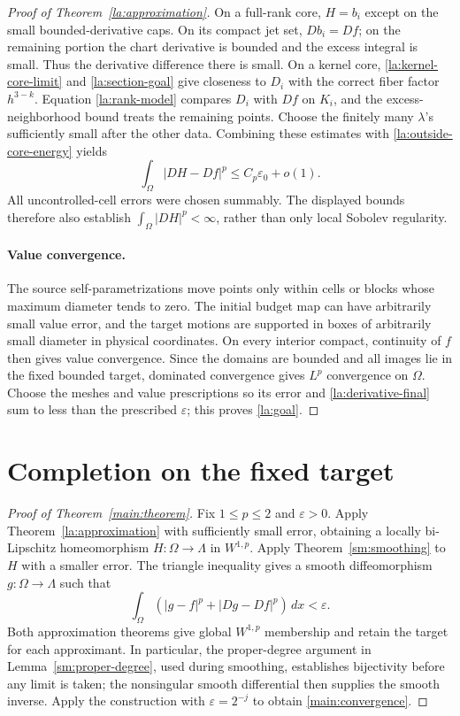 \documentclass[11pt]{article}
\numberwithin{equation}{section}
\theoremstyle{definition}
\theoremstyle{remark}
\begin{document}
\begin{proof}[Proof of Theorem~\ref{la:approximation}]
On a full-rank core, $H=b_i$ except on the small bounded-derivative
caps.  On its compact jet set, $Db_i=Df$; on the remaining portion the
chart derivative is bounded and the excess integral is small.
Thus the derivative difference there is small.  On a kernel core,
\eqref{la:kernel-core-limit} and \eqref{la:section-goal} give closeness
to $D_i$ with the correct fiber factor $h^{3-k}$.  Equation
\eqref{la:rank-model} compares $D_i$ with $Df$ on $K_i$, and the
excess-neighborhood bound treats the remaining points.  Choose the
finitely many $\lambda$'s sufficiently small after the other data.
Combining these estimates with \eqref{la:outside-core-energy} yields
\begin{equation}\label{la:derivative-final}
 \int_\Omega|DH-Df|^p\le C_p\varepsilon_0+o(1).
\end{equation}
All uncontrolled-cell errors were chosen summably.  The displayed
bounds therefore also establish $\int_\Omega|DH|^p<\infty$, rather
than only local Sobolev regularity.

\paragraph{Value convergence.}
The source self-parametrizations move points only within cells or
blocks whose maximum diameter tends to zero.  The initial budget map
can have arbitrarily small value error, and the target motions are
supported in boxes of arbitrarily small diameter in physical
coordinates.  On every interior compact, continuity of $f$ then
gives value convergence.  Since the domains are bounded and all
images lie in the fixed bounded target, dominated convergence gives
$L^p$ convergence on $\Omega$.  Choose the meshes and value
prescriptions so its error and \eqref{la:derivative-final} sum to less
than the prescribed $\varepsilon$; this proves \eqref{la:goal}.

\end{proof}

\section{Completion on the fixed target}\label{sec:completion}

\begin{proof}[Proof of Theorem~\ref{main:theorem}]
Fix $1\le p\le2$ and $\varepsilon>0$. Apply Theorem~\ref{la:approximation} with sufficiently small error, obtaining a locally bi-Lipschitz homeomorphism $H:\Omega\to\Lambda$ in $W^{1,p}$. Apply Theorem~\ref{sm:smoothing} to $H$ with a smaller error. The triangle inequality gives a smooth diffeomorphism $g:\Omega\to\Lambda$ such that
\[
 \int_\Omega (|g-f|^p+|Dg-Df|^p)\,dx<\varepsilon.
\]
Both approximation theorems give global $W^{1,p}$ membership and retain
the target for each approximant. In particular, the proper-degree
argument in Lemma~\ref{sm:proper-degree}, used during smoothing,
establishes bijectivity before any limit is taken; the nonsingular
smooth differential then supplies the smooth inverse. Apply the
construction with $\varepsilon=2^{-j}$ to obtain
\eqref{main:convergence}.
\end{proof}

\begingroup



\endgroup
\end{document}

